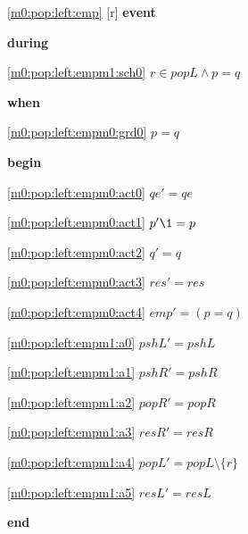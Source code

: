 \noindent \ref{m0:pop:left:emp} [r] \textbf{event}
\begin{block}
\item \textbf{during}
\begin{block}
\item[ \eqref{m0:pop:left:empm1:sch0} ]$r \in popL \land p = q $ %
\end{block}
\item \textbf{when}
\begin{block}
\item[ \eqref{m0:pop:left:empm0:grd0} ]$p = q $ %
\end{block}
\item \textbf{begin}
\begin{block}
\item[ \eqref{m0:pop:left:empm0:act0} ]$qe' = qe $ %
\item[ \eqref{m0:pop:left:empm0:act1} ]$p' \1= p $ %
\item[ \eqref{m0:pop:left:empm0:act2} ]$q' = q $ %
\item[ \eqref{m0:pop:left:empm0:act3} ]$res' = res $ %
\item[ \eqref{m0:pop:left:empm0:act4} ]$emp' = (p = q) $ %
\item[ \eqref{m0:pop:left:empm1:a0} ]$pshL' = pshL $ %
\item[ \eqref{m0:pop:left:empm1:a1} ]$pshR' = pshR $ %
\item[ \eqref{m0:pop:left:empm1:a2} ]$popR' = popR $ %
\item[ \eqref{m0:pop:left:empm1:a3} ]$resR' = resR $ %
\item[ \eqref{m0:pop:left:empm1:a4} ]$popL' = popL \setminus \{ r \} $ %
\item[ \eqref{m0:pop:left:empm1:a5} ]$resL' = resL $ %
\end{block}
\item \textbf{end} \\
\end{block}
